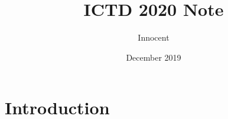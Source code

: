 \documentclass{article}
\title{ICTD 2020 Note}
\author{Innocent}
\date{December 2019}
\begin{document}
\maketitle

\section{Introduction}
\end{document}
